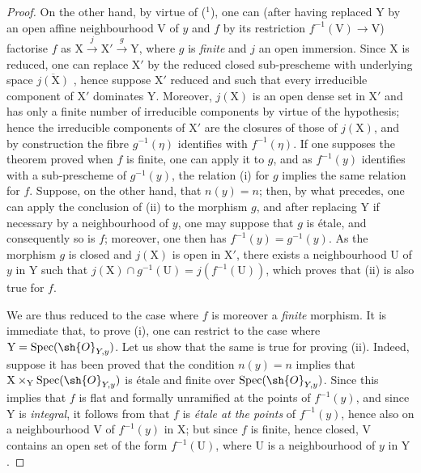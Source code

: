 \begin{proof}
On the other hand, by virtue of  (${}^1$), one can (after having replaced $\mathrm{Y}$ by an open affine neighbourhood $\mathrm{V}$ of $y$ and $f$ by its restriction $f^{-1}(\mathrm{V})\to\mathrm{V}$) factorise $f$ as $\mathrm{X}\xrightarrow{j}\mathrm{X}'\xrightarrow{g}\mathrm{Y}$, where $g$ is \emph{finite} and $j$ an open immersion.
Since $\mathrm{X}$ is reduced, one can replace $\mathrm{X}'$ by the reduced closed sub-prescheme with underlying space $\overline{j(\mathrm{X})}$ , hence suppose $\mathrm{X}'$ reduced and such that every irreducible component of $\mathrm{X}'$ dominates $\mathrm{Y}$.
Moreover, $j(\mathrm{X})$ is an open dense set in $\mathrm{X}'$ and has only a finite number of irreducible components by virtue of the hypothesis; hence  the irreducible components of $\mathrm{X}'$ are the closures of those of $j(\mathrm{X})$, and by construction the fibre $g^{-1}(\eta)$ identifies with $f^{-1}(\eta)$.
If one supposes the theorem proved when $f$ is finite, one can apply it to $g$, and as $f^{-1}(y)$ identifies with a sub-prescheme of $g^{-1}(y)$, the relation (i) for $g$ implies the same relation for $f$.
Suppose, on the other hand, that $n(y)=n$; then, by what precedes, one can apply the conclusion of (ii) to the morphism $g$, and after replacing $\mathrm{Y}$ if necessary by a neighbourhood of $y$, one may suppose that $g$ is \'etale, and consequently so is $f$; moreover, one then has $f^{-1}(y)=g^{-1}(y)$.
As the morphism $g$ is closed and $j(\mathrm{X})$ is open in $\mathrm{X}'$, there exists a neighbourhood $\mathrm{U}$ of $y$ in $\mathrm{Y}$ such that $j(\mathrm{X})\cap g^{-1}(\mathrm{U})=j(f^{-1}(\mathrm{U}))$, which proves that (ii) is also true for $f$.

We are thus reduced to the case where $f$ is moreover a \emph{finite} morphism.
It is immediate that, to prove (i), one can restrict to the case where $\mathrm{Y}=\operatorname{Spec}(\sh{O}_{Y,y})$.
Let us show that the same is true for proving (ii).
Indeed, suppose it has been proved that the condition $n(y)=n$ implies that $\mathrm{X}\times_{\mathrm{Y}}\operatorname{Spec}(\sh{O}_{Y,y})$ is \'etale and finite over $\operatorname{Spec}(\sh{O}_{Y,y})$. Since this implies that $f$ is flat and formally unramified at the points of $f^{-1}(y)$, and since $\mathrm{Y}$ is \emph{integral}, it follows from  that $f$ is \emph{\'etale at the points} of $f^{-1}(y)$, hence also on a neighbourhood $\mathrm{V}$ of $f^{-1}(y)$ in $\mathrm{X}$; but since $f$ is finite, hence closed, $\mathrm{V}$ contains an open set of the form $f^{-1}(\mathrm{U})$, where $\mathrm{U}$ is a neighbourhood of $y$ in $\mathrm{Y}$.


\end{proof}
